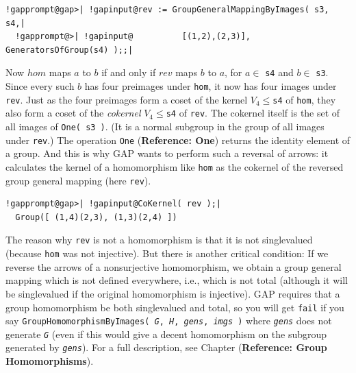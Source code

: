 \documentclass[a4paper,11pt]{report}
\begin{document}
{{ 
\begin{Verbatim}[commandchars=!@|,fontsize=\small,frame=single,label=Example]
  !gapprompt@gap>| !gapinput@rev := GroupGeneralMappingByImages( s3, s4,|
  !gapprompt@>| !gapinput@          [(1,2),(2,3)], GeneratorsOfGroup(s4) );;|
\end{Verbatim}
 

 Now $hom$ maps $a$ to $b$ if and only if $rev$ maps $b$ to $a$, for $a \in$ \texttt{s4} and $b \in$ \texttt{s3}. Since every such $b$ has four preimages under \texttt{hom}, it now has four images under \texttt{rev}. Just as the four preimages form a coset of the kernel $V_4 \leq $\texttt{s4} of \texttt{hom}, they also form a coset of the \emph{cokernel} $V_4 \leq $\texttt{s4} of \texttt{rev}. The cokernel itself is the set of all images of \texttt{One( s3 )}. (It is a normal subgroup in the group of all images under \texttt{rev}.) The operation \texttt{One} (\textbf{Reference: One}) returns the identity element of a group. And this is why \textsf{GAP} wants to perform such a reversal of arrows: it calculates the kernel of a
homomorphism like \texttt{hom} as the cokernel of the reversed group general mapping (here \texttt{rev}). 

 
\begin{Verbatim}[commandchars=!@|,fontsize=\small,frame=single,label=Example]
  !gapprompt@gap>| !gapinput@CoKernel( rev );|
  Group([ (1,4)(2,3), (1,3)(2,4) ])
\end{Verbatim}
 

   The reason why \texttt{rev} is not a homomorphism is that it is not single\texttt{}valued
(because \texttt{hom} was not injective). But there is another critical condition: If we reverse the
arrows of a non\texttt{}surjective homomorphism, we obtain a group
general mapping which is not defined everywhere, i.e., which is not total
(although it will be single\texttt{}valued if the original
homomorphism is injective). \textsf{GAP} requires that a group homomorphism be both single\texttt{}valued
and total, so you will get \texttt{fail} if you say \texttt{GroupHomomorphismByImages( \mbox{\texttt{\mdseries\slshape G}}, \mbox{\texttt{\mdseries\slshape H}}, \mbox{\texttt{\mdseries\slshape gens}}, \mbox{\texttt{\mdseries\slshape imgs}} )} where \mbox{\texttt{\mdseries\slshape gens}} does not generate \mbox{\texttt{\mdseries\slshape G}} (even if this would give a decent homomorphism on the subgroup generated by \mbox{\texttt{\mdseries\slshape gens}}). For a full description, see Chapter  (\textbf{Reference: Group Homomorphisms}). 

}}
\end{document}

